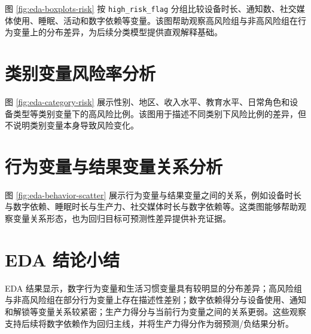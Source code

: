 图 \ref{fig:eda-boxplots-risk} 按 \texttt{high\_risk\_flag} 分组比较设备时长、通知数、社交媒体使用、睡眠、活动和数字依赖等变量。该图帮助观察高风险组与非高风险组在行为变量上的分布差异，为后续分类模型提供直观解释基础。


\section{类别变量风险率分析}

图 \ref{fig:eda-category-risk} 展示性别、地区、收入水平、教育水平、日常角色和设备类型等类别变量下的高风险比例。该图用于描述不同类别下风险比例的差异，但不说明类别变量本身导致风险变化。


\section{行为变量与结果变量关系分析}

图 \ref{fig:eda-behavior-scatter} 展示行为变量与结果变量之间的关系，例如设备时长与数字依赖、睡眠时长与生产力、社交媒体时长与数字依赖等。这类图能够帮助观察变量关系形态，也为回归目标可预测性差异提供补充证据。


\section{EDA 结论小结}

EDA 结果显示，数字行为变量和生活习惯变量具有较明显的分布差异；高风险组与非高风险组在部分行为变量上存在描述性差别；数字依赖得分与设备使用、通知和解锁等变量关系较紧密；生产力得分与当前行为变量之间的关系更弱。这些观察支持后续将数字依赖作为回归主线，并将生产力得分作为弱预测/负结果分析。
